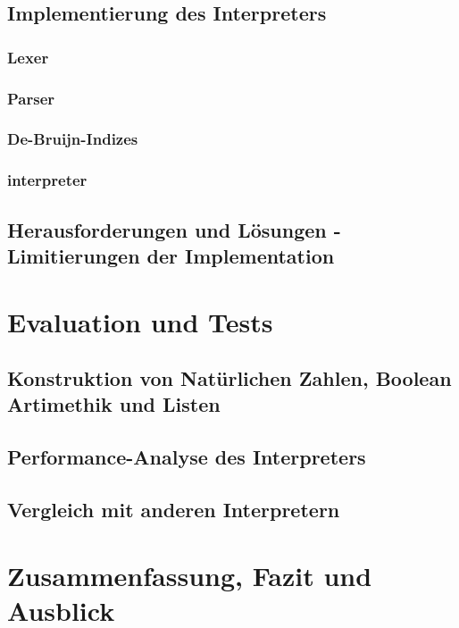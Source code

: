 \documentclass{article}
\begin{document}
\subsection{Implementierung des Interpreters}

\subsubsection{Lexer}

\subsubsection{Parser}

\subsubsection{De-Bruijn-Indizes}

\subsubsection{interpreter}

\subsection{Herausforderungen und Lösungen - Limitierungen der Implementation}


\section{Evaluation und Tests}

\subsection{Konstruktion von Natürlichen Zahlen, Boolean Artimethik und Listen}

\subsection{Performance-Analyse des Interpreters}

\subsection{Vergleich mit anderen Interpretern}


\section{Zusammenfassung, Fazit und Ausblick}
\end{document}
